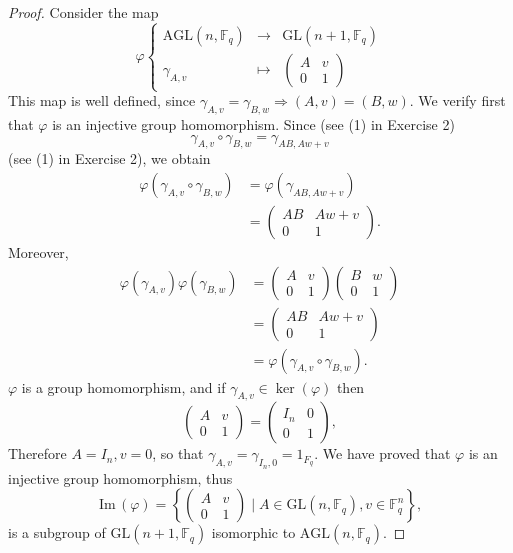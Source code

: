 \documentclass[11pt,a4paper]{article}
\newcommand{\F}{\mathbb{F}}
\newcommand{\im}{\,\mathrm{Im}\,}
\begin{document}
{  \begin{proof} Consider the map
  $$
  \varphi
  \left\{
  \begin{array}{ccc}
  \mathrm{AGL}(n,\F_q)& \to & \mathrm{GL}(n+1,\F_q)\\
  \gamma_{A,v} & \mapsto & 
  \begin{pmatrix}
  A & v\\
  0 & 1
  \end{pmatrix}
  \end{array}
  \right.
  $$
  This map is well defined, since $\gamma_{A,v} = \gamma_{B,w} \Rightarrow (A ,v) = (B,w)$. We verify first that $\varphi$ is an injective group homomorphism.
  Since (see (1) in Exercise 2)
 $$ \gamma_{A,v} \circ \gamma_{B,w} = \gamma_{AB,Aw+v}$$
 (see (1) in Exercise 2), we obtain
 \begin{align*}
 \varphi(\gamma_{A,v} \circ \gamma_{B,w}) &= \varphi(\gamma_{AB,Aw+v})\\
 &=
 \begin{pmatrix}
 AB & Aw+v\\
 0 & 1
 \end{pmatrix}.
 \end{align*}
 Moreover,
 \begin{align*}
  \varphi(\gamma_{A,v} ) \varphi( \gamma_{B,w})&= 
  \begin{pmatrix}
  A & v\\
  0 & 1
  \end{pmatrix}
\begin{pmatrix}
  B & w\\
  0 & 1
  \end{pmatrix}\\
&=
\begin{pmatrix}
  AB & Aw+v\\
  0 & 1
  \end{pmatrix}\\
  &=  \varphi(\gamma_{A,v} \circ \gamma_{B,w}).
 \end{align*}
 $\varphi$ is a group homomorphism, and if $\gamma_{A,v} \in \ker(\varphi)$ then 
 $$
   \begin{pmatrix}
  A & v\\
  0 & 1
  \end{pmatrix}=
    \begin{pmatrix}
  I_n & 0\\
  0 & 1
  \end{pmatrix},
 $$
 Therefore $A = I_n, v = 0$, so that $\gamma_{A,v} = \gamma_{I_n,0} = 1_{F_q}$. We have proved that $\varphi$ is an injective group homomorphism, thus
 $$
  \im(\varphi) = \left\{
  \begin{pmatrix}
  A & v\\
  0 & 1
  \end{pmatrix}
\mid A \in \mathrm{GL}(n,\F_q), v \in \F_q^n
  \right\},
  $$
  is a subgroup of $\mathrm{GL}(n+1,\F_q)$ isomorphic to $ \mathrm{AGL}(n,\F_q)$.
  \end{proof}  
  
}
\end{document}
